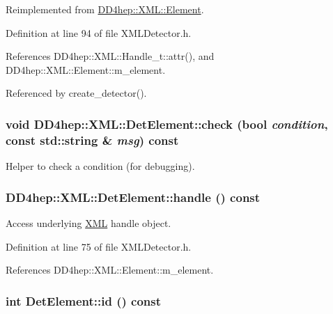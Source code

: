 Reimplemented from \hyperlink{class_d_d4hep_1_1_x_m_l_1_1_element_ab540a1af6399fe6a5b6ffe507dc3d4b5}{DD4hep::XML::Element}.

Definition at line 94 of file XMLDetector.h.

References DD4hep::XML::Handle\_\-t::attr(), and DD4hep::XML::Element::m\_\-element.

Referenced by create\_\-detector().\hypertarget{struct_d_d4hep_1_1_x_m_l_1_1_det_element_a1793225434c30cfa857059eb14fe5240}{
\subsubsection[{check}]{\setlength{\rightskip}{0pt plus 5cm}void DD4hep::XML::DetElement::check (bool {\em condition}, \/  const std::string \& {\em msg}) const}}
\label{struct_d_d4hep_1_1_x_m_l_1_1_det_element_a1793225434c30cfa857059eb14fe5240}


Helper to check a condition (for debugging). \hypertarget{struct_d_d4hep_1_1_x_m_l_1_1_det_element_a0ff536f81c598c734503c109bdbf6d6a}{
\subsubsection[{handle}]{ DD4hep::XML::DetElement::handle () const}}
\label{struct_d_d4hep_1_1_x_m_l_1_1_det_element_a0ff536f81c598c734503c109bdbf6d6a}


Access underlying \hyperlink{namespace_d_d4hep_1_1_x_m_l}{XML} handle object. 

Definition at line 75 of file XMLDetector.h.

References DD4hep::XML::Element::m\_\-element.\hypertarget{struct_d_d4hep_1_1_x_m_l_1_1_det_element_ab792b1e02d95042fd94897283df9f8fa}{
\subsubsection[{id}]{\setlength{\rightskip}{0pt plus 5cm}int DetElement::id () const}}
\label{struct_d_d4hep_1_1_x_m_l_1_1_det_element_ab792b1e02d95042fd94897283df9f8fa}



